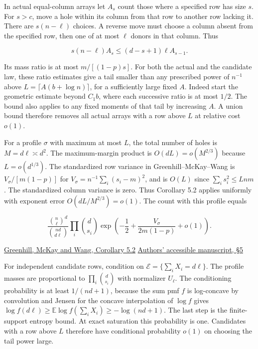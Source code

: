 In actual equal-column arrays let $A_s$ count those where a specified row has size $s$. For $s>c$, move a hole within its column from that row to another row lacking it. There are $s(n-\ell)$ choices. A reverse move must choose a column absent from the specified row, then one of at most $\ell$ donors in that column. Thus

\begin{equation*}
s(n-\ell)A_s\le (d-s+1)\ell A_{s-1}.
\end{equation*}

Its mass ratio is at most $m/[(1-p)s]$. For both the actual and the candidate law, these ratio estimates give a tail smaller than any prescribed power of $n^{-1}$ above $L=\lceil A(b+\log n)\rceil$, for a sufficiently large fixed $A$. Indeed start the geometric estimate beyond $C_1 b$, where each successive ratio is at most $1/2$. The bound also applies to any fixed moments of that tail by increasing $A$. A union bound therefore removes all actual arrays with a row above $L$ at relative cost $o(1)$.

For a profile $\sigma$ with maximum at most $L$, the total number of holes is $M=d\ell\asymp d^2$. The maximum-margin product is $O(dL)=o(M^{2/3})$ because $L=o(d^{1/3})$. The standardized row variance in Greenhill--McKay--Wang is $V_{\sigma}/[m(1-p)]$ for $V_{\sigma}=n^{-1}\sum_i(s_i-m)^2$, and is $O(L)$ since $\sum_i s_i^2\le Lnm$. The standardized column variance is zero. Thus Corollary 5.2 applies uniformly with exponent error $O(dL/M^{2/3})=o(1)$. The count with this profile equals

\begin{equation*}
\frac{\binom n\ell^d}{\binom{nd}{d\ell}}\prod_i\binom d{s_i}
\exp\left(-\frac12+\frac{V_{\sigma}}{2m(1-p)}+o(1)\right).
\end{equation*}

\href{https://doi.org/10.1016/j.jcta.2005.03.005}{Greenhill, McKay and Wang, Corollary 5.2} \enspace \href{https://users.cecs.anu.edu.au/~bdm/papers/irregular.pdf}{Authors' accessible manuscript, §5}

For independent candidate rows, condition on $\mathcal E=\{\sum_i X_i=d\ell\}$. The profile masses are proportional to $\prod_i\binom d{s_i}$ with normalizer $U_\ell$. The conditioning probability is at least $1/(nd+1)$, because the sum pmf $f$ is log-concave by convolution and Jensen for the concave interpolation of $\log f$ gives $\log f(d\ell)\ge\mathbb E\log f(\sum_iX_i)\ge-\log(nd+1)$. The last step is the finite-support entropy bound. At exact saturation this probability is one. Candidates with a row above $L$ therefore have conditional probability $o(1)$ on choosing the tail power large.


